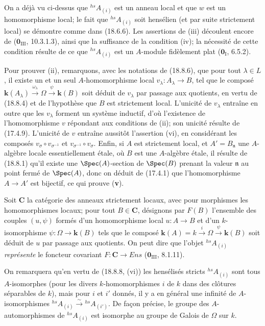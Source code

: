 On a déjà vu ci-dessus que ${}^{hs}\!A_{(i)}$ est un anneau local et que $w$ est un homomorphisme local; le fait que ${}^{hs}\!A_{(i)}$ soit hensélien (et par suite strictement local) se démontre comme dans (18.6.6). Les assertions de (iii) découlent encore de ($\mathbf{0}_{\mathrm{III}}$, 10.3.1.3), ainsi que la suffisance de la condition (iv); la nécessité de cette condition résulte de ce que ${}^{hs}\!A_{(i)}$ est un $A$-module fidèlement plat ($\mathbf{0}_{\mathrm I}$, 6.5.2).

Pour prouver (ii), remarquons, avec les notations de (18.8.6), que pour tout $\lambda\in L$, il existe un et un seul $A$-homomorphisme local $v_\lambda:A_\lambda\to B$, tel que le composé $\boldsymbol{k}(A_\lambda)\xrightarrow{\omega_\lambda}\Omega\xrightarrow{\psi}\boldsymbol{k}(B)$ soit déduit de $v_\lambda$ par passage aux quotients, en vertu de (18.8.4) et de l'hypothèse que $B$ est strictement local. L'unicité de $v_\lambda$ entraîne en outre que les $v_\lambda$ forment un système inductif, d'où l'existence de l'homomorphisme $v$ répondant aux conditions de (ii); son unicité résulte de (17.4.9). L'unicité de $v$ entraîne aussitôt l'assertion (vi), en considérant les composés $v_\sigma\circ v_{\sigma^{-1}}$ et $v_{\sigma^{-1}}\circ v_\sigma$. Enfin, si $A$ est strictement local, et $A'=B_{\mathfrak n}$ une $A$-algèbre locale essentiellement étale, où $B$ est une $A$-algèbre étale, il résulte de (18.8.1) qu'il existe une $\Spec(A)$-section de $\Spec(B)$ prenant la valeur $\mathfrak n$ au point fermé de $\Spec(A)$, donc on déduit de (17.4.1) que l'homomorphisme $A\to A'$ est bijectif, ce qui prouve (\textbf{v}).

\begin{env}[18.8.8.1]
\label{IV.18.8.8.1}
Soit $\boldsymbol{C}$ la catégorie des anneaux strictement locaux, avec pour morphismes les homomorphismes locaux; pour tout $B\in\boldsymbol{C}$, désignons par $F(B)$ l'ensemble des couples $(u,\psi)$ formés d'un homomorphisme local $u:A\to B$ et d'un $k$-isomorphisme $\psi:\Omega\to\boldsymbol{k}(B)$ tels que le composé $\boldsymbol{k}(A)=k\xrightarrow{i}\Omega\xrightarrow{\psi}\boldsymbol{k}(B)$ soit déduit de $u$ par passage aux quotients. On peut dire que l'objet ${}^{hs}\!A_{(i)}$ \emph{représente} le foncteur covariant $F:\boldsymbol{C}\to\boldsymbol{\mathit{Ens}}$ ($\mathbf{0}_{\mathrm{III}}$, 8.1.11).

On remarquera qu'en vertu de (18.8.8, (vi)) les hensélisés stricts ${}^{hs}\!A_{(i)}$ sont tous $A$-isomorphes (pour les divers $k$-homomorphismes $i$ de $k$ dans des clôtures séparables de $k$), mais pour $i$ et $i'$ donnés, il y a en général une infinité de $A$-isomorphismes ${}^{hs}\!A_{(i)}\xrightarrow{\sim}{}^{hs}\!A_{(i')}$. De façon précise, le groupe des $A$-automorphismes de ${}^{hs}\!A_{(i)}$ est isomorphe au groupe de Galois de $\Omega$ sur $k$.
\end{env}

